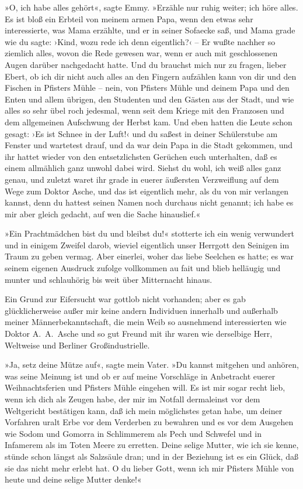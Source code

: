 »O, ich habe alles gehört«, sagte Emmy. »Erzähle nur ruhig weiter;
ich höre alles. Es ist bloß ein Erbteil von meinem armen Papa, wenn
den etwas sehr interessierte, was Mama erzählte, und er in seiner
Sofaecke saß, und Mama grade wie du sagte: ›Kind, wozu rede ich
denn eigentlich?‹ – Er wußte nachher so ziemlich alles, wovon die
Rede gewesen war, wenn er auch mit geschlossenen Augen darüber
nachgedacht hatte. Und du brauchst mich nur zu fragen, lieber
Ebert, ob ich dir nicht auch alles an den Fingern aufzählen kann
von dir und den Fischen in Pfisters Mühle – nein, von Pfisters
Mühle und deinem Papa und den Enten und allem übrigen, den
Studenten und den Gästen aus der Stadt, und wie alles so sehr übel
roch jedesmal, wenn seit dem Kriege mit den Franzosen und dem
allgemeinen Aufschwung der Herbst kam. Und eben hatten die Leute
schon gesagt: ›Es ist Schnee in der Luft!‹ und du saßest in deiner
Schülerstube am Fenster und wartetest drauf, und da war dein Papa
in die Stadt gekommen, und ihr hattet wieder von den
entsetzlichsten Gerüchen euch unterhalten, daß es einem allmählich
ganz unwohl dabei wird. Siehst du wohl, ich weiß alles ganz genau,
und zuletzt waret ihr grade in euerer äußersten Verzweiflung auf
dem Wege zum Doktor Asche, und das ist eigentlich mehr, als du von
mir verlangen kannst, denn du hattest seinen Namen noch durchaus
nicht genannt; ich habe es mir aber gleich gedacht, auf wen die
Sache hinauslief.«

»Ein Prachtmädchen bist du und bleibst du!« stotterte ich ein wenig
verwundert und in einigem Zweifel darob, wieviel eigentlich unser
Herrgott den Seinigen im Traum zu geben vermag. Aber einerlei,
woher das liebe Seelchen es hatte; es war seinem eigenen Ausdruck
zufolge vollkommen au fait und blieb helläugig und munter und
schlauhörig bis weit über Mitternacht hinaus.

Ein Grund zur Eifersucht war gottlob nicht vorhanden; aber es gab
glücklicherweise außer mir keine andern Individuen innerhalb und
außerhalb meiner Männerbekanntschaft, die mein Weib so ausnehmend
interessierten wie Doktor A.~A.~Asche und so gut Freund mit ihr
waren wie derselbige Herr, Weltweise und Berliner
Großindustrielle.

»Ja, setz deine Mütze auf«, sagte mein Vater. »Du kannst mitgehen
und anhören, was seine Meinung ist und ob er auf meine Vorschläge
in Anbetracht euerer Weihnachtsferien und Pfisters Mühle eingehen
will. Es ist mir sogar recht lieb, wenn ich dich als Zeugen habe,
der mir im Notfall dermaleinst vor dem Weltgericht bestätigen kann,
daß ich mein möglichstes getan habe, um deiner Vorfahren uralt Erbe
vor dem Verderben zu bewahren und es vor dem Ausgehen wie Sodom und
Gomorra in Schlimmerem als Pech und Schwefel und in Infamerem als
im Toten Meere zu erretten. Deine selige Mutter, wie ich sie kenne,
stünde schon längst als Salzsäule dran; und in der Beziehung ist es
ein Glück, daß sie das nicht mehr erlebt hat. O du lieber Gott,
wenn ich mir Pfisters Mühle von heute und deine selige Mutter
denke!«

